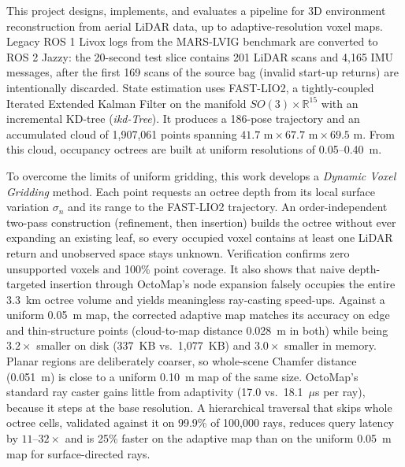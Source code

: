 \documentclass[11pt,a4paper]{report}
\begin{document}
This project designs, implements, and evaluates a pipeline for 3D environment reconstruction from aerial LiDAR data, up to adaptive-resolution voxel maps. Legacy ROS 1 Livox logs from the MARS-LVIG benchmark are converted to ROS 2 Jazzy: the 20-second test slice contains 201 LiDAR scans and 4,165 IMU messages, after the first 169 scans of the source bag (invalid start-up returns) are intentionally discarded. State estimation uses FAST-LIO2, a tightly-coupled Iterated Extended Kalman Filter on the manifold $SO(3) \times \mathbb{R}^{15}$ with an incremental KD-tree (\textit{ikd-Tree}). It produces a 186-pose trajectory and an accumulated cloud of 1,907,061 points spanning $41.7\text{ m} \times 67.7\text{ m} \times 69.5\text{ m}$. From this cloud, occupancy octrees are built at uniform resolutions of 0.05--0.40~m.

To overcome the limits of uniform gridding, this work develops a \textit{Dynamic Voxel Gridding} method. Each point requests an octree depth from its local surface variation $\sigma_n$ and its range to the FAST-LIO2 trajectory. An order-independent two-pass construction (refinement, then insertion) builds the octree without ever expanding an existing leaf, so every occupied voxel contains at least one LiDAR return and unobserved space stays unknown. Verification confirms zero unsupported voxels and 100\% point coverage. It also shows that naive depth-targeted insertion through OctoMap's node expansion falsely occupies the entire $3.3$~km octree volume and yields meaningless ray-casting speed-ups. Against a uniform 0.05~m map, the corrected adaptive map matches its accuracy on edge and thin-structure points (cloud-to-map distance 0.028~m in both) while being $3.2\times$ smaller on disk (337~KB vs.\ 1,077~KB) and $3.0\times$ smaller in memory. Planar regions are deliberately coarser, so whole-scene Chamfer distance (0.051~m) is close to a uniform 0.10~m map of the same size. OctoMap's standard ray caster gains little from adaptivity (17.0 vs.\ 18.1~$\mu$s per ray), because it steps at the base resolution. A hierarchical traversal that skips whole octree cells, validated against it on 99.9\% of 100,000 rays, reduces query latency by $11$--$32\times$ and is 25\% faster on the adaptive map than on the uniform 0.05~m map for surface-directed rays.

\newpage

\tableofcontents
\newpage
\listoffigures
\listoftables
\newpage
\end{document}
